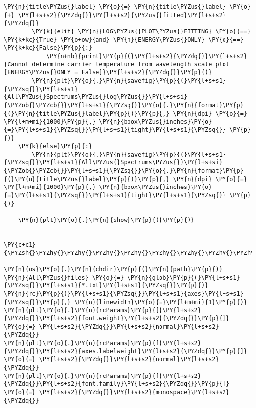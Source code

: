 \begin{tcolorbox}[breakable, size=fbox, boxrule=1pt, pad at break*=1mm,colback=cellbackground, colframe=cellborder]
\begin{Verbatim}[commandchars=\\\{\}]
            \PY{n}{title\PYZus{}label} \PY{o}{=} \PY{n}{title\PYZus{}label} \PY{o}{+} \PY{l+s+s2}{\PYZdq{}}\PY{l+s+s2}{\PYZus{}fitted}\PY{l+s+s2}{\PYZdq{}}
        \PY{k}{elif} \PY{n}{LOG\PYZus{}PLOT\PYZus{}FITTING} \PY{o}{==} \PY{k+kc}{True} \PY{o+ow}{and} \PY{n}{ENERGY\PYZus{}ONLY} \PY{o}{==} \PY{k+kc}{False}\PY{p}{:}
            \PY{n+nb}{print}\PY{p}{(}\PY{l+s+s2}{\PYZdq{}}\PY{l+s+s2}{Cannot determine carrier temperature from wavelength scale plot [ENERGY\PYZus{}ONLY = False]}\PY{l+s+s2}{\PYZdq{}}\PY{p}{)}
        \PY{n}{plt}\PY{o}{.}\PY{n}{savefig}\PY{p}{(}\PY{l+s+s1}{\PYZsq{}}\PY{l+s+s1}{All\PYZus{}Spectrums\PYZus{}log\PYZus{}}\PY{l+s+si}{\PYZob{}\PYZcb{}}\PY{l+s+s1}{\PYZsq{}}\PY{o}{.}\PY{n}{format}\PY{p}{(}\PY{n}{title\PYZus{}label}\PY{p}{)}\PY{p}{,} \PY{n}{dpi} \PY{o}{=} \PY{l+m+mi}{1000}\PY{p}{,} \PY{n}{bbox\PYZus{}inches}\PY{o}{=}\PY{l+s+s1}{\PYZsq{}}\PY{l+s+s1}{tight}\PY{l+s+s1}{\PYZsq{}} \PY{p}{)}
    \PY{k}{else}\PY{p}{:}
        \PY{n}{plt}\PY{o}{.}\PY{n}{savefig}\PY{p}{(}\PY{l+s+s1}{\PYZsq{}}\PY{l+s+s1}{All\PYZus{}Spectrums\PYZus{}}\PY{l+s+si}{\PYZob{}\PYZcb{}}\PY{l+s+s1}{\PYZsq{}}\PY{o}{.}\PY{n}{format}\PY{p}{(}\PY{n}{title\PYZus{}label}\PY{p}{)}\PY{p}{,} \PY{n}{dpi} \PY{o}{=} \PY{l+m+mi}{1000}\PY{p}{,} \PY{n}{bbox\PYZus{}inches}\PY{o}{=}\PY{l+s+s1}{\PYZsq{}}\PY{l+s+s1}{tight}\PY{l+s+s1}{\PYZsq{}} \PY{p}{)}
        
    \PY{n}{plt}\PY{o}{.}\PY{n}{show}\PY{p}{(}\PY{p}{)}  


\PY{c+c1}{\PYZsh{}\PYZhy{}\PYZhy{}\PYZhy{}\PYZhy{}\PYZhy{}\PYZhy{}\PYZhy{}\PYZhy{}\PYZhy{}\PYZhy{}\PYZhy{}\PYZhy{}\PYZhy{}\PYZhy{}\PYZhy{}\PYZhy{}\PYZhy{}\PYZhy{}\PYZhy{}\PYZhy{}\PYZhy{}\PYZhy{}\PYZhy{}\PYZhy{}\PYZhy{}\PYZhy{}\PYZhy{}\PYZhy{}\PYZhy{}\PYZhy{}\PYZhy{}\PYZhy{}\PYZhy{}\PYZhy{}\PYZhy{}\PYZhy{}\PYZhy{}MAIN\PYZhy{}\PYZhy{}\PYZhy{}\PYZhy{}\PYZhy{}\PYZhy{}\PYZhy{}\PYZhy{}\PYZhy{}\PYZhy{}\PYZhy{}\PYZhy{}\PYZhy{}\PYZhy{}\PYZhy{}\PYZhy{}\PYZhy{}\PYZhy{}\PYZhy{}\PYZhy{}\PYZhy{}\PYZhy{}\PYZhy{}\PYZhy{}\PYZhy{}\PYZhy{}\PYZhy{}\PYZhy{}\PYZhy{}\PYZhy{}\PYZhy{}\PYZhy{}\PYZhy{}\PYZhy{}\PYZhy{}\PYZhy{}\PYZsh{}}

\PY{n}{os}\PY{o}{.}\PY{n}{chdir}\PY{p}{(}\PY{n}{path}\PY{p}{)}
\PY{n}{All\PYZus{}files} \PY{o}{=} \PY{n}{glob}\PY{p}{(}\PY{l+s+s1}{\PYZsq{}}\PY{l+s+s1}{*.txt}\PY{l+s+s1}{\PYZsq{}}\PY{p}{)}
\PY{n}{rc}\PY{p}{(}\PY{l+s+s1}{\PYZsq{}}\PY{l+s+s1}{axes}\PY{l+s+s1}{\PYZsq{}}\PY{p}{,} \PY{n}{linewidth}\PY{o}{=}\PY{l+m+mi}{1}\PY{p}{)}
\PY{n}{plt}\PY{o}{.}\PY{n}{rcParams}\PY{p}{[}\PY{l+s+s2}{\PYZdq{}}\PY{l+s+s2}{font.weight}\PY{l+s+s2}{\PYZdq{}}\PY{p}{]} \PY{o}{=} \PY{l+s+s2}{\PYZdq{}}\PY{l+s+s2}{normal}\PY{l+s+s2}{\PYZdq{}}
\PY{n}{plt}\PY{o}{.}\PY{n}{rcParams}\PY{p}{[}\PY{l+s+s2}{\PYZdq{}}\PY{l+s+s2}{axes.labelweight}\PY{l+s+s2}{\PYZdq{}}\PY{p}{]} \PY{o}{=} \PY{l+s+s2}{\PYZdq{}}\PY{l+s+s2}{normal}\PY{l+s+s2}{\PYZdq{}}
\PY{n}{plt}\PY{o}{.}\PY{n}{rcParams}\PY{p}{[}\PY{l+s+s2}{\PYZdq{}}\PY{l+s+s2}{font.family}\PY{l+s+s2}{\PYZdq{}}\PY{p}{]} \PY{o}{=} \PY{l+s+s2}{\PYZdq{}}\PY{l+s+s2}{monospace}\PY{l+s+s2}{\PYZdq{}}


\end{Verbatim}
\end{tcolorbox}
